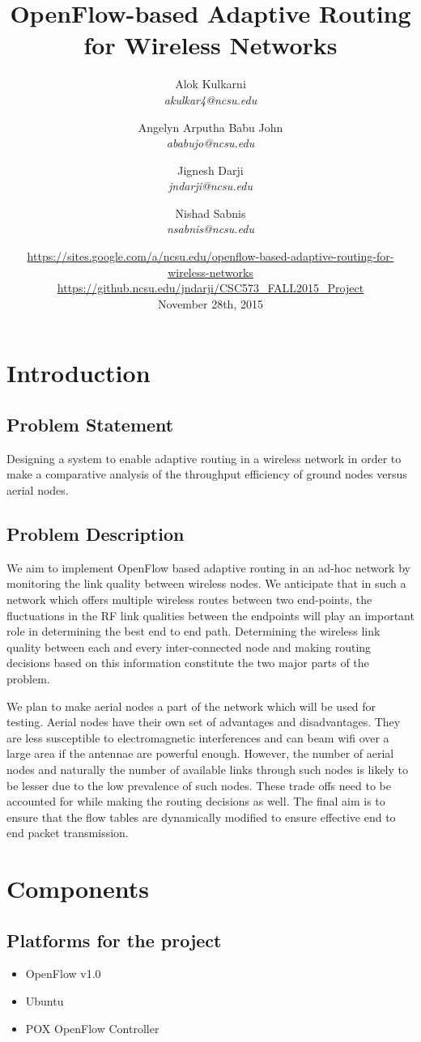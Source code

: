 \documentclass{article}
\title{OpenFlow-based Adaptive Routing for Wireless Networks}
\author{
    Alok Kulkarni \\
    \textit{akulkar4@ncsu.edu}
    \and
    Angelyn Arputha Babu John \\
    \textit{ababujo@ncsu.edu}
    \and
    Jignesh Darji \\
    \textit{jndarji@ncsu.edu}
    \and 
    Nishad Sabnis \\
    \textit{nsabnis@ncsu.edu}
}
\date{
    \small{\url{https://sites.google.com/a/ncsu.edu/openflow-based-adaptive-routing-for-wireless-networks}}\\
    \small{\url{https://github.ncsu.edu/jndarji/CSC573_FALL2015_Project}}\\
    November 28th, 2015}
\begin{document}
\maketitle
\section{Introduction}
\subsection{Problem Statement}
Designing a system to enable adaptive routing in a wireless network in order to make a comparative analysis of the
throughput efficiency of ground nodes versus aerial nodes.
\subsection{Problem Description}
\par We aim to implement OpenFlow based adaptive routing in an ad-hoc network by monitoring the link quality between wireless
nodes. We anticipate that in such a network which offers multiple wireless routes between two end-points, the
fluctuations in the RF link qualities between the endpoints will play an important role in determining the best end to
end path. Determining the wireless link quality between each and every inter-connected node and making routing decisions
based on this information constitute the two major parts of the problem. 
\par We plan to make aerial nodes a part of the network which will be used for testing. Aerial nodes have their own set of
advantages and disadvantages. They are less susceptible to electromagnetic interferences and can beam wifi over a large
area if the antennae are powerful enough. However, the number of aerial nodes and naturally the number of available
links through such nodes is likely to be lesser due to the low prevalence of such nodes. These trade offs need to be
accounted for while making the routing decisions as well. The final aim is to ensure that the flow tables are
dynamically modified to ensure effective end to end packet transmission. 
\section{Components}
\subsection{Platforms for the project}
\begin{itemize}
\item OpenFlow v1.0
\item Ubuntu
\item POX OpenFlow Controller
\end{itemize}
\end{document}
